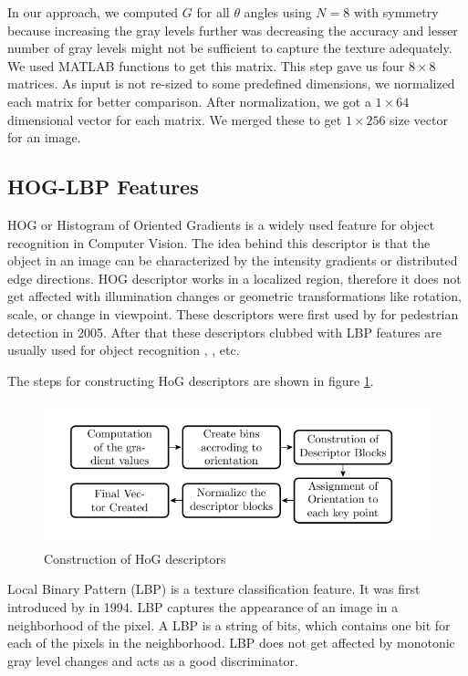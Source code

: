 In our approach, we computed $G$ for all $\theta$ angles using $N=8$ with symmetry because increasing the gray levels further was decreasing the accuracy and lesser number of gray levels might not be sufficient to capture the texture adequately. We used MATLAB 
functions to get this matrix. This step gave us four $8 \times 8$ matrices. As input is not re-sized to some predefined dimensions, we 
normalized each matrix for better comparison. After normalization, 
we got a $1\times 64 $ dimensional vector for each matrix. We merged 
these to get $1\times 256 $ size vector for an image.

\subsection{HOG-LBP Features}
HOG or Histogram of Oriented Gradients is a widely used 
feature for object recognition in Computer Vision. The idea behind 
this descriptor is that the object in an image can be characterized by the 
intensity gradients or distributed edge directions. HOG 
descriptor works in a localized region, therefore it does not get 
affected with illumination changes or geometric transformations like 
rotation, scale, or change in viewpoint. These descriptors were 
first used by \citet*{HOG} for pedestrian detection in 2005. After that these descriptors clubbed with LBP features are usually 
used for object recognition \citet*{hog1}, \citet*{hog2},\citet*{hog3} etc. 

The steps for constructing HoG descriptors are shown in figure \ref{fig:hogProcess}.
 \begin{center}
\begin{figure}
\includegraphics[width=\linewidth]{./Pictures/HOG/hogProcess.jpg}
\caption{Construction of HoG descriptors }
\label{fig:hogProcess}
\end{figure}
\end{center}
Local Binary Pattern (LBP) is a texture classification feature. It was first 
introduced by  \citet*{ojala} in 1994. LBP captures the 
appearance of an image in a neighborhood of the pixel. A LBP is a 
string of bits, which contains one bit for each of the pixels in
the neighborhood. LBP does not get affected by monotonic gray level 
changes and acts as a good discriminator. 


